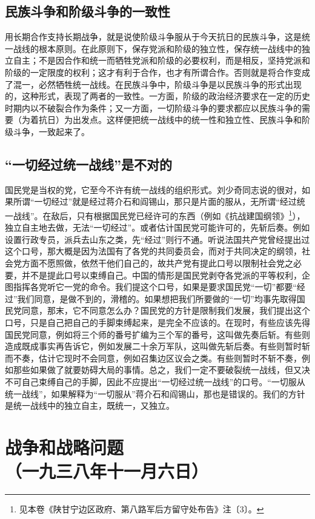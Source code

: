 \documentclass[cn,11pt,chinese]{elegantbook}
\def\myformat#1{\hfil\hfil #1}
\begin{document}
\subsection*{\myformat{民族斗争和阶级斗争的一致性}}
用长期合作支持长期战争，就是说使阶级斗争服从于今天抗日的民族斗争，这是统一战线的根本原则。在此原则下，保存党派和阶级的独立性，保存统一战线中的独立自主；不是因合作和统一而牺牲党派和阶级的必要权利，而是相反，坚持党派和阶级的一定限度的权利；这才有利于合作，也才有所谓合作。否则就是将合作变成了混一，必然牺牲统一战线。在民族斗争中，阶级斗争是以民族斗争的形式出现的，这种形式，表现了两者的一致性。一方面，阶级的政治经济要求在一定的历史时期内以不破裂合作为条件；又一方面，一切阶级斗争的要求都应以民族斗争的需要（为着抗日）为出发点。这样便把统一战线中的统一性和独立性、民族斗争和阶级斗争，一致起来了。\\
\subsection*{\myformat{“一切经过统一战线”是不对的}}
国民党是当权的党，它至今不许有统一战线的组织形式。刘少奇同志说的很对，如果所谓“一切经过”就是经过蒋介石和阎锡山，那只是片面的服从，无所谓“经过统一战线”。在敌后，只有根据国民党已经许可的东西（例如《抗战建国纲领》\footnote[6]{ 见本卷《陕甘宁边区政府、第八路军后方留守处布告》注〔3〕。}），独立自主地去做，无法“一切经过”。或者估计国民党可能许可的，先斩后奏。例如设置行政专员，派兵去山东之类，先“经过”则行不通。听说法国共产党曾经提出过这个口号，那大概是因为法国有了各党的共同委员会，而对于共同决定的纲领，社会党方面不愿照做，依然干他们自己的，故共产党有提此口号以限制社会党之必要，并不是提此口号以束缚自己。中国的情形是国民党剥夺各党派的平等权利，企图指挥各党听它一党的命令。我们提这个口号，如果是要求国民党“一切”都要“经过”我们同意，是做不到的，滑稽的。如果想把我们所要做的“一切”均事先取得国民党同意，那末，它不同意怎么办？国民党的方针是限制我们发展，我们提出这个口号，只是自己把自己的手脚束缚起来，是完全不应该的。在现时，有些应该先得国民党同意，例如将三个师的番号扩编为三个军的番号，这叫做先奏后斩。有些则造成既成事实再告诉它，例如发展二十余万军队，这叫做先斩后奏。有些则暂时斩而不奏，估计它现时不会同意，例如召集边区议会之类。有些则暂时不斩不奏，例如那些如果做了就要妨碍大局的事情。总之，我们一定不要破裂统一战线，但又决不可自己束缚自己的手脚，因此不应提出“一切经过统一战线”的口号。“一切服从统一战线”，如果解释为“一切服从”蒋介石和阎锡山，那也是错误的。我们的方针是统一战线中的独立自主，既统一，又独立。\\
\newpage\section*{\myformat{战争和战略问题}\\\myformat{（一九三八年十一月六日）}}
\end{document}
